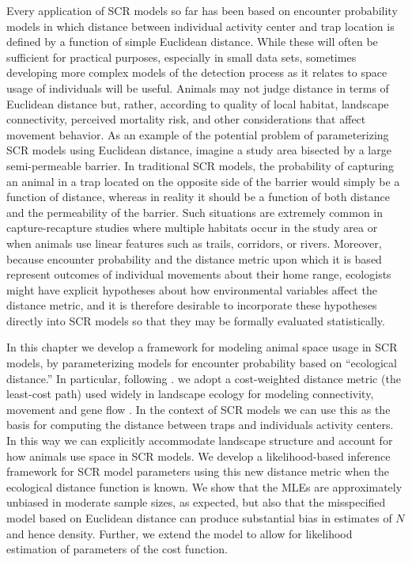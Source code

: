 Every application of SCR models so far has been based on encounter
probability models in which distance between individual activity
center and trap location is defined by a function of simple Euclidean
distance.  While these will often be sufficient for practical
purposes, especially in small data sets, sometimes developing more
complex models of the detection process as it relates to space usage
of individuals will be useful.  Animals may not judge distance in
terms of Euclidean distance but, rather, according to quality of local
habitat, landscape connectivity, perceived mortality risk, and other
considerations that affect movement behavior.
As an example of the potential problem of parameterizing SCR models
using Euclidean distance, imagine a study area bisected by a large
semi-permeable barrier. In traditional SCR models, the probability of
capturing an animal in a trap located on the opposite side of the
barrier would simply be a function of distance, whereas in reality it
should be a function of both distance and the permeability of the
barrier. Such situations are extremely common in capture-recapture
studies where multiple habitats occur in the study area or when
animals use linear features such as trails, corridors, or rivers.
 Moreover, because encounter probability and the distance
metric upon which it is based represent outcomes of individual
movements about their home range, ecologists might have explicit
hypotheses about how environmental variables affect the distance
metric, and it is therefore desirable to incorporate these hypotheses
directly into SCR models so that they may be formally evaluated
statistically.

In this chapter we develop a framework for modeling animal space usage
in SCR models, by parameterizing models for encounter probability
based on ``ecological distance.''  In particular, following
\citet{royle_etal:2012ecol}.  we adopt a cost-weighted distance metric
(the least-cost path) used widely in landscape ecology for modeling
connectivity, movement and gene flow
\citep{adriaensen_etal:2003,manel_etal:2003,mcrae_etal:2008}. In the
context of SCR models we can use this as the basis for computing the
distance between traps and individuals activity centers. In this way
we can explicitly accommodate landscape structure and account for how
animals use space in SCR models. We develop a likelihood-based
inference framework for SCR model parameters using this new distance
metric when the ecological distance function is known.  We show that
the MLEs are approximately unbiased in moderate sample sizes, as
expected, but also that the misspecified model based on Euclidean
distance can produce substantial bias in estimates of $N$ and hence
density.  Further, we extend the model to allow for likelihood
estimation of parameters of the cost function.

